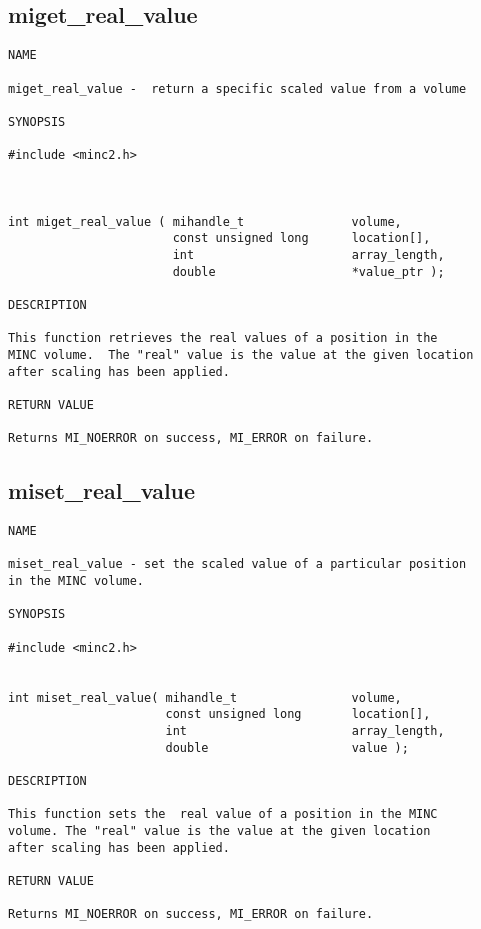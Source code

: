 \documentclass{article}
\begin{document}
\subsection{miget\_real\_value}
\begin{verbatim}
NAME

miget_real_value -  return a specific scaled value from a volume

SYNOPSIS

#include <minc2.h>



int miget_real_value ( mihandle_t               volume,
                       const unsigned long      location[],
                       int                      array_length,
                       double                   *value_ptr );

DESCRIPTION

This function retrieves the real values of a position in the
MINC volume.  The "real" value is the value at the given location 
after scaling has been applied.

RETURN VALUE

Returns MI_NOERROR on success, MI_ERROR on failure.
\end{verbatim}

\subsection{miset\_real\_value}
\begin{verbatim}
NAME

miset_real_value - set the scaled value of a particular position 
in the MINC volume.

SYNOPSIS

#include <minc2.h>


int miset_real_value( mihandle_t                volume,
                      const unsigned long       location[],
                      int                       array_length,
                      double                    value );

DESCRIPTION

This function sets the  real value of a position in the MINC
volume. The "real" value is the value at the given location 
after scaling has been applied.

RETURN VALUE

Returns MI_NOERROR on success, MI_ERROR on failure.
\end{verbatim}
\end{document}
